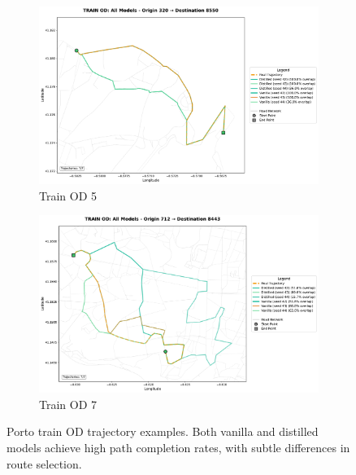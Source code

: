 \begin{figure}[H]
\begin{subfigure}{0.49\linewidth}
        \centering
        \includegraphics[width=\linewidth]{assets/plots/eval/porto/trajectories/train_od_comparison_5_origin320_dest8550.pdf}
        \caption{Train OD 5}
    \end{subfigure}
    \begin{subfigure}{0.49\linewidth}
        \centering
        \includegraphics[width=\linewidth]{assets/plots/eval/porto/trajectories/train_od_comparison_7_origin712_dest8443.pdf}
        \caption{Train OD 7}
    \end{subfigure}
    \caption{Porto train OD trajectory examples. Both vanilla and distilled models achieve high path completion rates, with subtle differences in route selection.}
    \label{fig:appendix-porto-traj-train}
\end{figure}

